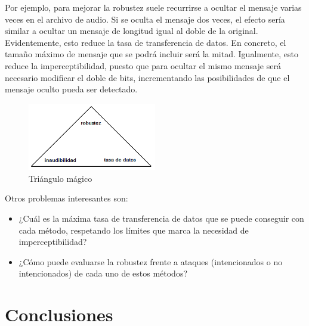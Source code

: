 \documentclass[12pt]{article}
\begin{document}
Por ejemplo, para mejorar la robustez suele recurrirse a ocultar el mensaje varias veces en el archivo de audio. Si se oculta el mensaje dos veces, el efecto sería similar a ocultar un mensaje de longitud igual al doble de la original. Evidentemente, esto reduce la tasa de transferencia de datos. En concreto, el tamaño máximo de mensaje que se podrá incluir será la mitad. Igualmente, esto reduce la imperceptibilidad, puesto que para ocultar el mismo mensaje será necesario modificar el doble de bits, incrementando las posibilidades de que el mensaje oculto pueda ser detectado.

\begin{figure}[h]
  \centering
    \includegraphics[width=0.5\textwidth]{img/magictriangle}
  \caption{Triángulo mágico}
  \label{magictriangle}
\end{figure}

Otros problemas interesantes son:

\begin{itemize}

\item ¿Cuál es la máxima tasa de transferencia de datos que se puede conseguir con cada método, respetando los límites que marca la necesidad de imperceptibilidad?

\item ¿Cómo puede evaluarse la robustez frente a ataques (intencionados o no intencionados) de cada uno de estos métodos?

\end{itemize}

\newpage
\section{Conclusiones}
\end{document}
